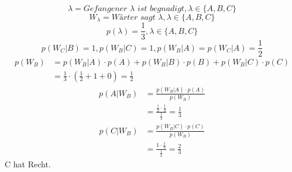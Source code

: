 \documentclass[10pt,a4paper]{article}
\begin{document}
\begin{equation}
  \lambda = \textit{Gefangener $\lambda$ ist begnadigt}, \lambda \in \{ A, B, C \}
\end{equation}
\begin{equation}
  W_{\lambda} = \textit{Wärter sagt $\lambda$}, \lambda \in \{ A, B, C \}
\end{equation}
\begin{equation}
  p(\lambda) = \frac{1}{3}, \lambda \in \{ A, B, C \}
\end{equation}
\begin{equation}
  p(W_{C} | B) = 1, p(W_{B} | C) = 1, p(W_{B} | A) = p(W_{C} | A) = \frac{1}{2}
\end{equation}
\begin{align*}
  p(W_{B}) & = p(W_{B} | A) \cdot p(A) + p(W_{B} | B) \cdot p(B) + p(W_{B} | C) \cdot p(C)\\
  & = \frac{1}{3} \cdot \left( \frac{1}{2} + 1 + 0 \right) = \frac{1}{2}
\end{align*}
\begin{align*}
  p(A | W_{B}) & = \frac{p(W_{B} | A) \cdot p(A)}{p(W_{B})}\\
  & = \frac{\frac{1}{2} \cdot \frac{1}{3}}{\frac{1}{2}} = \frac{1}{3}
\end{align*}
\begin{align*}
  p(C | W_{B}) & = \frac{p(W_{B} | C) \cdot p(C)}{p(W_{B})}\\
  & = \frac{1 \cdot \frac{1}{3}}{\frac{1}{2}} = \frac{2}{3}
\end{align*}
C hat Recht.
\end{document}
